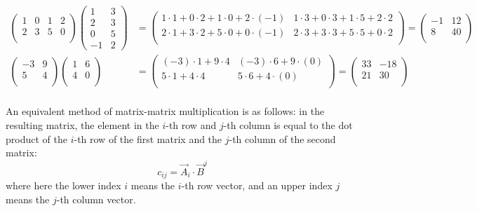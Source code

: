 \begin{example}
  
  \begin{align*}
	\begin{pmatrix}
	  1 & 0 & 1 & 2\\
	  2 & 3 & 5 & 0\\
	\end{pmatrix}
	\begin{pmatrix}
	  1 & 3\\
	  2 & 3\\
	  0 & 5\\
	  -1 & 2
	\end{pmatrix} &= 
	\begin{pmatrix}
	  1\cdot1 + 0\cdot2 + 1\cdot0 + 2\cdot(-1) & 1\cdot3 + 0\cdot3 + 1\cdot5 + 2\cdot2\\
	  2\cdot1 + 3\cdot2 + 5\cdot0 + 0\cdot(-1) & 2\cdot3 + 3\cdot3 + 5\cdot5 + 0\cdot2\\
	\end{pmatrix} = 
	\begin{pmatrix}
	  -1 & 12\\
	   8 & 40\\
	\end{pmatrix}\\[5mm] 
	\begin{pmatrix}
	  -3 & 9\\
	  5 & 4\\
	\end{pmatrix}
	\begin{pmatrix}
	  1 & 6\\
	  4 & 0\\
	\end{pmatrix} &= 
	\begin{pmatrix}
	  (-3)\cdot1 + 9\cdot4 & (-3)\cdot6 + 9\cdot(0)\\
	  5\cdot1 + 4\cdot4 & 5\cdot6 + 4\cdot(0)\\
	\end{pmatrix} = 
	\begin{pmatrix}
	   33 & -18\\
	   21 & 30\\
	\end{pmatrix}\\[5mm] 
  \end{align*}
\end{example}

An equivalent method of matrix-matrix multiplication is as follows: in the resulting matrix, the element in the $i$-th row and $j$-th column is equal to the dot product of the $i$-th row of the first matrix and the $j$-th column of the second matrix:
\begin{equation*}
  c_{ij} = \vec{A}_{i} \cdot \vec{B}^{j}
\end{equation*}
where here the lower index $i$ means the $i$-th row vector, and an upper index $j$ means the $j$-th column vector.

